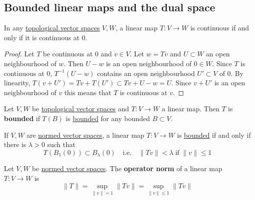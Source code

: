 \documentclass{article}
\begin{document}
\subsection{Bounded linear maps and the dual space}

\begin{fact}
    In any \hyperlink{def:tVS}{topological vector spaces} $V, W$, a linear map $T: V \to W$ is continuous if and only if it is continuous at $0$.
\end{fact}

\begin{proof}
    Let $T$ be continuous at $0$ and $v \in V$. Let $w = Tv$ and $U \subset W$ an open neighbourhood of $w$. Then $U - w$ is an open neighbourhood of $0 \in W$. Since $T$ is continuous at $0$, $T^{-1}(U - w)$ contains an open neighbourhood $U' \subset V$ of $0$.
    By linearity, $T(v + U') = Tv + T(U') \subset Tv + U - w = U$.  Since $v + U'$ is an open neighbourhood of $v$ this means that $T$ is continuous at $v$.
\end{proof}

\begin{defi}
    Let $V, W$ be \hyperlink{def:tVS}{topological vector spaces} and $T: V \to W$ a linear map.
    Then $T$ is \textbf{bounded} if $T(B)$ is \hyperlink{def:boundedSubs}{bounded} for any bounded $B \subset V$.
\end{defi}

\begin{fact}
    If $V, W$ are \hyperlink{def:nvs}{normed vector spaces}, a linear map $T: V \to W$ is \hyperlink{def:boundedLinearMap}{bounded} if and only if there is $\lambda > 0$ such that
    \begin{equation*}
        T(B_1(0)) \subset B_\lambda(0) \quad \text{i.e.} \quad \|Tv\| < \lambda \; \text{if} \; \|v\| \le 1
    \end{equation*}
\end{fact}


\begin{defi}
    Let $V, W$ be \hyperlink{def:nvs}{normed vector spaces}. The \textbf{operator norm} of a linear map $T: V \to W$ is
    \begin{equation*}
        \|T\| = \sup_{\|v\| = 1} \|T v\| =\sup_{\|v\| \leq 1} \|T v\|
    \end{equation*}
\end{defi}
\end{document}
